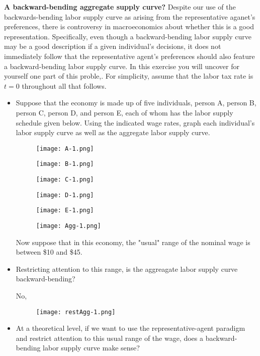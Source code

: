 \documentclass[11pt]{SelfArxOneColBMN}
\begin{document}
\begin{exercise}
	\textbf{A backward-bending aggregate supply curve?} Despite our use of the backwards-bending labor supply curve as arising from the representative aganet's preferences, there is controversy in macroeconomics about whether this is a good representation. Specifically, even though a backward-bending labor supply curve may be a good description if a given individual's decisions, it does not immediately follow that the representative agent's preferences should also feature a backward-bending labor supply curve. In this exercise you will uncover for yourself one part of this proble,. For simplicity, assume that the labor tax rate is $t = 0$ throughout all that follows.
	\begin{itemize}
		\item Suppose that the economy is made up of five individuals, person A, person B, person C, person D, and person E, each of whom has the labor supply schedule given below. Using the indicated wage rates, graph each individual's labor supply curve as well as the aggregate labor supply curve.
		\begin{figure}
			\texttt{[image: A-1.png]}
		\end{figure}
		\begin{figure}
			\texttt{[image: B-1.png]}
		\end{figure}
                \begin{figure}
			\texttt{[image: C-1.png]}
		\end{figure}
                \begin{figure}
			\texttt{[image: D-1.png]}
		\end{figure}
                \begin{figure}
			\texttt{[image: E-1.png]}
		\end{figure}
                \begin{figure}
			\texttt{[image: Agg-1.png]}
		\end{figure}
\noindent Now suppose that in this economy, the "usual" range of the nominal wage is between \$10 and \$45.
		\item Restricting attention to this range, is the aggreagate labor supply curve backward-bending?
		\begin{solution}
			No,
		\end{solution}
		\begin{figure}
			\texttt{[image: restAgg-1.png]}
		\end{figure}
		\item At a theoretical level, if we want to use the representative-agent paradigm and restrict attention to this usual range of the wage, does a backward-bending labor supply curve make sense?

\end{itemize}
\end{exercise}
\end{document}
